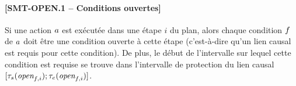 



\paragraph*{[SMT-OPEN.1 -- Conditions ouvertes]} Si une action $a$ est exécutée dans une étape $i$ du plan, alors chaque condition $f$ de $a$ doit être une condition ouverte à cette étape (c'est-à-dire qu'un lien causal est requis pour cette condition). De plus, le début de l'intervalle sur lequel cette condition est requise se trouve dans l'intervalle de protection du lien causal $[\tau_{s}(\textit{open}_{f,i});\tau_{e}(\textit{open}_{f,i})]$.

